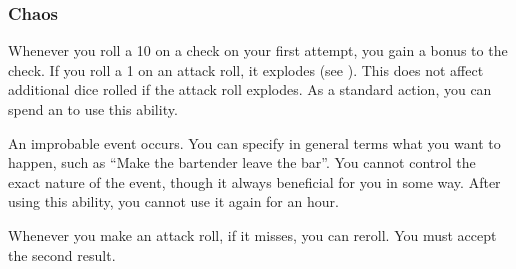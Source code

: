         \subsubsection{Chaos}
             Whenever you roll a 10 on a check on your first attempt, you gain a  bonus to the check.
             If you roll a 1 on an attack roll, it explodes (see ).
            This does not affect additional dice rolled if the attack roll explodes.
             As a standard action, you can spend an  to use this ability.
            \begin{ability}
                \begin{spelltargetinginfo}
                    \spellrng{\rnglong}
                \end{spelltargetinginfo}
                \begin{spelleffects}
                    \spelleffect An improbable event occurs.
                    You can specify in general terms what you want to happen, such as ``Make the bartender leave the bar''.
                    You cannot control the exact nature of the event, though it always beneficial for you in some way.
                    \spellspecial After using this ability, you cannot use it again for an hour.
                \end{spelleffects}
            \end{ability}
             Whenever you make an attack roll, if it misses, you can reroll.
            You must accept the second result.

